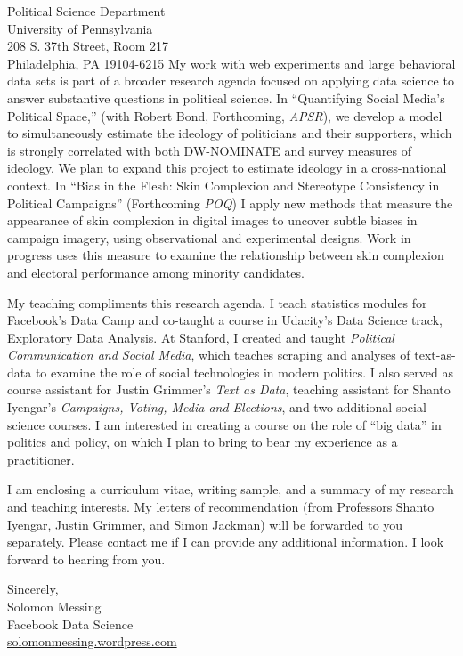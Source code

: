 \documentclass[fontsize=12pt, paper=a4]{scrlttr2}
\begin{document}
\begin{letter}{Political Science Department \\
University of Pennsylvania\\
208 S. 37th Street, Room 217\\
Philadelphia, PA 19104-6215}
My work with web experiments and large behavioral data sets is part of a broader research agenda focused on applying data science to answer substantive questions in political science.  In ``Quantifying Social Media's Political Space,'' (with Robert Bond, Forthcoming, \emph{APSR}), we develop a model to simultaneously estimate the ideology of politicians and their supporters, which is strongly correlated with both DW-NOMINATE and survey measures of ideology.  We plan to expand this project to estimate ideology in a cross-national context.  In ``Bias in the Flesh: Skin Complexion and Stereotype Consistency in Political Campaigns'' (Forthcoming \emph{POQ}) I apply new methods that measure the appearance of skin complexion in digital images to uncover subtle biases in campaign imagery, using observational and experimental designs.  Work in progress uses this measure to examine the relationship between skin complexion and electoral performance among minority candidates.  

My teaching compliments this research agenda.  I teach statistics modules for Facebook's Data Camp and co-taught a course in Udacity's Data Science track, Exploratory Data Analysis.  At Stanford, I created and taught \emph{Political Communication and Social Media}, which teaches scraping and analyses of text-as-data to examine the role of social technologies in modern politics.  I also served as course assistant for Justin Grimmer's \emph{Text as Data}, teaching assistant for Shanto Iyengar's \emph{Campaigns, Voting, Media and Elections}, and two additional social science courses.  I am interested in creating a course on the role of ``big data'' in politics and policy, on which I plan to bring to bear my experience as a practitioner.  

I am enclosing a curriculum vitae, writing sample, and a summary of my research and teaching interests. My letters of recommendation (from Professors Shanto Iyengar, Justin Grimmer, and Simon Jackman) will be forwarded to you separately. Please contact me if I can provide any additional information. I look forward to hearing from you.

\enlargethispage{6\baselineskip}

\closing{
Sincerely, \\
Solomon Messing\\
Facebook Data Science \\
 \url{solomonmessing.wordpress.com}
}

\end{letter}

%
%
\end{document}
